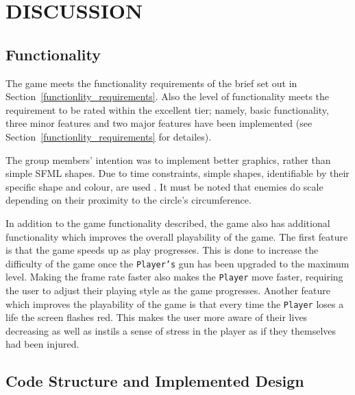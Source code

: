 \documentclass[10pt,twocolumn]{witseiepaper}
\begin{document}
\section{DISCUSSION}
\subsection{Functionality}

The game meets the functionality requirements of the brief set out in Section~\ref{functionlity_requirements}. Also the level of functionality meets the requirement to be rated within the excellent tier; namely, basic functionality, three minor features and two major features have been implemented (see Section~\ref{functionlity_requirements} for detailes). 

The group members' intention was to implement better graphics, rather than simple SFML shapes. Due to time constraints, simple shapes, identifiable by their specific shape and colour, are used . It must be noted that enemies do scale depending on their proximity to the circle's circumference.

In addition to the game functionality described, the game also has additional functionality which improves the overall playability of the game. The first feature is that the game speeds up as play progresses. This is done to increase the difficulty of the game once the \texttt{Player's} gun has been upgraded to the maximum level. Making the frame rate faster also makes the \texttt{Player} move faster, requiring the user to adjust their playing style as the game progresses. Another feature which improves the playability of the game is that every time the \texttt{Player} loses a life the screen flashes red. This makes the user more aware of their lives decreasing as well as instils a sense of stress in the player as if they themselves had been injured. 

\subsection{Code Structure and Implemented Design}\label{critical_code_structure}


\end{document}
